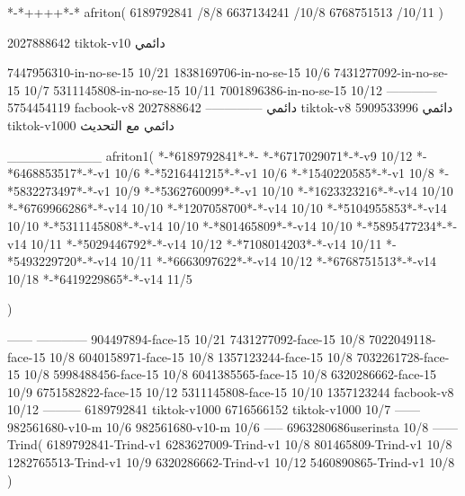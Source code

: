 *-*++++*-*
afriton(
6189792841 /8/8
6637134241 /10/8
6768751513 /10/11
)

2027888642 tiktok-v10
دائمي


7447956310-in-no-se-15 10/21
1838169706-in-no-se-15 10/6
7431277092-in-no-se-15 10/7
5311145808-in-no-se-15 10/11
7001896386-in-no-se-15 10/12
------------
5754454119 facbook-v8
دائمي
--------------
2027888642 tiktok-v8
دائمي
5909533996 tiktok-v1000
دائمي مع التحديث

__________
afriton1(
*-*6189792841*-*-
*-*6717029071*-*-v9 10/12
*-*6468853517*-*-v1 10/6
*-*5216441215*-*-v1 10/6
*-*1540220585*-*-v1 10/8
*-*5832273497*-*-v1 10/9
*-*5362760099*-*-v1 10/10
*-*1623323216*-*-v14 10/10
*-*6769966286*-*-v14 10/10
*-*1207058700*-*-v14 10/10
*-*5104955853*-*-v14 10/10
*-*5311145808*-*-v14 10/10
*-*801465809*-*-v14 10/10
*-*5895477234*-*-v14 10/11
*-*5029446792*-*-v14 10/12
*-*7108014203*-*-v14 10/11
*-*5493229720*-*-v14 10/11
*-*6663097622*-*-v14 10/12
*-*6768751513*-*-v14 10/18
*-*6419229865*-*-v14 11/5


)

------
------------
904497894-face-15 10/21
7431277092-face-15 10/8
7022049118-face-15 10/8
6040158971-face-15 10/8
1357123244-face-15 10/8
7032261728-face-15 10/8
5998488456-face-15 10/8
6041385565-face-15 10/8
6320286662-face-15 10/9
6751582822-face-15 10/12
5311145808-face-15 10/10
1357123244 facbook-v8 10/12
---------
6189792841 tiktok-v1000
6716566152 tiktok-v1000
10/7
------
982561680‏-v10-m 10/6
982561680-v10-m 10/6
-----
6963280686userinsta 10/8
------
Trind(
6189792841-Trind-v1 
6283627009-Trind-v1 10/8
801465809-Trind-v1 10/8
1282765513-Trind-v1 10/9
6320286662-Trind-v1 10/12
5460890865-Trind-v1 10/8
)
